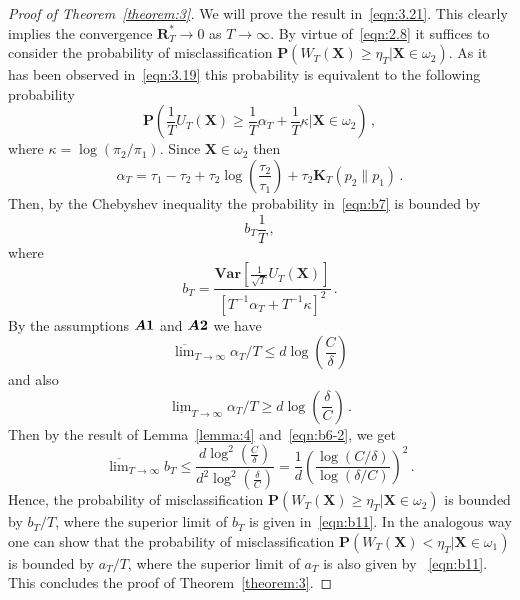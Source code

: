 \documentclass[lettersize,journal,onecolumn]{IEEEtran}
\theoremstyle{definition}
\newcommand{\Var}[1]{\mathbf{Var}\left[#1\right]}
\newcommand{\assumption}[1]{{\rm \boldsymbol{A#1}}}
\begin{document}
\begin{proof}[Proof of Theorem~\ref{theorem:3}]
	We will prove the result in~\eqref{eqn:3.21}. This clearly implies the
	convergence $\mathbf{R}_{T}^{*}\to0$ as $T\to\infty$. By virtue of~\eqref{eqn:2.8}
	it suffices to consider the probability of misclassification
	$\mathbf{P}\left(W_{T}(\mathbf{X})\geq\eta_{T}|\mathbf{X}\in\omega_{2}\right)$. As it
	has been observed in~\eqref{eqn:3.19} this probability is equivalent 
	to the following probability
	\begin{equation}
		\mathbf{P}\left(
		\frac{1}{T}U_{T}(\mathbf{X})\geq\frac{1}{T}\alpha_{T} +
		\frac{1}{T}\kappa | \mathbf{X}\in\omega_{2}
		\right)
		\label{eqn:b7}\,,
	\end{equation}
	where $\kappa=\log\left(\pi_{2}/\pi_{1}\right)$. Since $\mathbf{X}\in\omega_{2}$ 
	then
	\begin{equation}
		\alpha_{T} = 
		\tau_{1} - \tau_{2} + \tau_{2} \log\left(\frac{\tau_{2}}{\tau_{1}}\right) +
		\tau_{2} \mathbf{K}_T(p_{2} \parallel p_{1})
		\label{eqn:b8}\,.
	\end{equation}
	Then, by the Chebyshev inequality the probability in~\eqref{eqn:b7} is bounded by
	\begin{equation}
		b_{T}\frac{1}{T}
		\label{eqn:b9}\,,
	\end{equation}
	where
	\begin{equation}
		b_{T} = \frac{
			\Var{\frac{1}{\sqrt{T}}U_{T}(\mathbf{X})}	
		}{
			\left[T^{-1}\alpha_{T}+T^{-1}\kappa\right]^2
		}
		\label{eqn:b10}\,.
	\end{equation}
	By the assumptions $\assumption{1}$ and $\assumption{2}$ we have
	\begin{equation}
		\overline{\lim}_{T\to\infty} \alpha_{T} / T \leq
		d \log\left(\frac{C}{\delta}\right)
		\label{eqn:b6-1}
	\end{equation}
	and also
	\begin{equation}
		\underline{\lim}_{T\to\infty} \alpha_{T} / T \geq
		d \log\left(\frac{\delta}{C}\right)
		\label{eqn:b6-2} \,.
	\end{equation}
	Then by the result of Lemma~\ref{lemma:4} and~\eqref{eqn:b6-2}, we get
	\begin{equation}
		\overline{\lim}_{T\to\infty} b_{T} \leq
		\frac{
			d \log^{2}\left(\frac{C}{\delta}\right)
		}{
			d^{2} \log^{2}\left(\frac{\delta}{C}\right)
		} = \frac{1}{d} \left(
		\frac{\log(C/\delta)}{\log(\delta/C)}			
		\right)^{2}
		\label{eqn:b11} \,.
	\end{equation}
	Hence, the probability of misclassification \mbox{$
		\mathbf{P}\left(W_{T}(\mathbf{X})\geq\eta_{T}|\mathbf{X}\in\omega_{2}\right)
		$} is bounded by $b_{T}/T$,	where the superior limit of $b_{T}$ is given in~\eqref{eqn:b11}.
	In the analogous way one can show that the probability of misclassification \mbox{$
		\mathbf{P}\left(W_{T}(\mathbf{X})<\eta_{T}|\mathbf{X}\in\omega_{1}\right)
		$} is bounded by $a_{T}/T$, where the superior limit of $a_{T}$ is also given
	by ~\eqref{eqn:b11}.
	This concludes the proof of Theorem~\ref{theorem:3}.
\end{proof}
\end{document}
